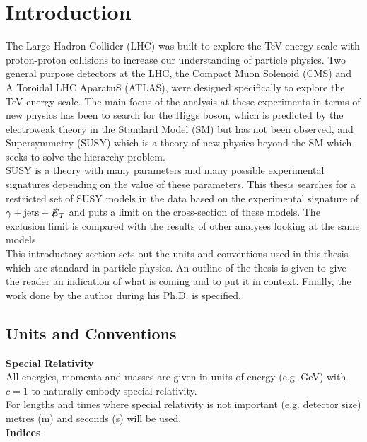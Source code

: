 \chapter{Introduction}

The Large Hadron Collider (LHC) was built to explore the TeV energy scale with
proton-proton collisions to increase our understanding of particle physics. Two 
general purpose detectors at the LHC, the Compact Muon Solenoid (CMS) and A 
Toroidal LHC AparatuS (ATLAS), were designed specifically to explore the TeV 
energy scale. The main focus of the analysis at these experiments in terms of 
new physics has been to search for the Higgs boson, which is predicted by the 
electroweak theory in the Standard Model (SM) but has not been observed, and 
Supersymmetry (SUSY) which is a theory of new physics beyond the SM which seeks 
to solve the hierarchy problem. \\

SUSY is a theory with many parameters and many possible experimental signatures
depending on the value of these parameters. This thesis searches for a 
restricted set of SUSY models in the data based on the experimental signature of 
$\gamma + \mbox{jets} + \slashed{E}_{T}$ and puts a limit on the cross-section of these 
models. The exclusion limit is compared with the results of other analyses 
looking at the same models. \\ 

This introductory section sets out the units and conventions used in this thesis 
which are standard in particle physics. An outline of the thesis is given to 
give the reader an indication of what is coming and to put it in context.
Finally, the work done by the author during his Ph.D. is specified.

\section{Units and Conventions}

{\bf Special Relativity} \\

All energies, momenta and masses are given in units of energy (e.g. GeV) with
$c=1$ to naturally embody special relativity. \\

For lengths and times where special relativity is not important (e.g. detector
size) metres (m) and seconds (s) will be used. \\

{\bf Indices} \\

